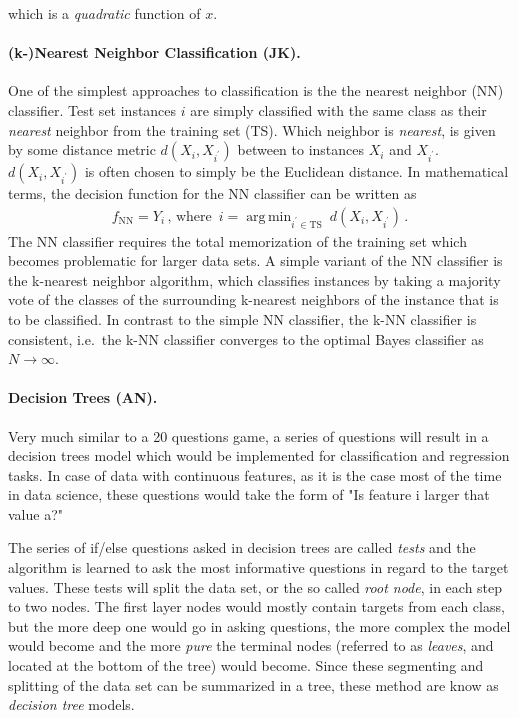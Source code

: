 \documentclass[12pt, a4paper]{scrartcl}
\DeclareMathOperator*{\argmin}{arg\,min}
\begin{document}
which is a \emph{quadratic} function of $x$. 

\paragraph{(k-)Nearest Neighbor Classification (JK).} One of the simplest approaches to classification is the the nearest neighbor (NN) classifier. Test set instances $i$ are simply classified with the same class as their \emph{nearest} neighbor from the training set (TS). 
Which neighbor is \emph{nearest},  is given by some distance metric $d(X_i, X_{i^\prime})$ between to instances $X_i$ and $X_{i^\prime}$. $d(X_i, X_{i^\prime})$ is often chosen to simply be the Euclidean distance.
In mathematical terms, the decision function for the NN classifier can be written as
\begin{align*}
	f_{\mathrm{NN}} = Y_i \, \text{,  where } \, i = \argmin_{i^\prime \in \mathrm{TS}} \: d(X_i, X_{i^\prime}) \, .
\end{align*}
The NN classifier requires the total memorization of the training set which becomes problematic for larger data sets.
A simple variant of the NN classifier is the k-nearest neighbor algorithm, which classifies instances by taking a majority vote of the classes of the surrounding k-nearest neighbors of the instance that is to be classified. In contrast to the simple NN classifier, the k-NN classifier is consistent, i.e.\  the k-NN classifier converges to the optimal Bayes classifier as $N\to\infty$.

\paragraph{Decision Trees (AN).} Very much similar to a 20 questions game, a series of questions will result in a decision trees model which would be implemented for classification and regression tasks. In case of data with continuous features, as it is the case most of the time in data science, these questions would take the form of "Is feature i larger that value a?" \citep{muller2016introduction}

The series of if/else questions asked in decision trees are called \emph{tests} and the algorithm is learned to ask the most informative questions in regard to the target values. These tests will split the data set, or the so called \emph{root node}, in each step to two nodes. The first layer nodes would mostly contain targets from each class, but the more deep one would go in asking questions, the more complex the model would become and the more \emph{pure} the terminal nodes (referred to as \emph{leaves}, and located at the bottom of the tree) would become. Since these segmenting and splitting of the data set can be summarized in a tree, these method are know as \emph{decision tree} models.
\end{document}
